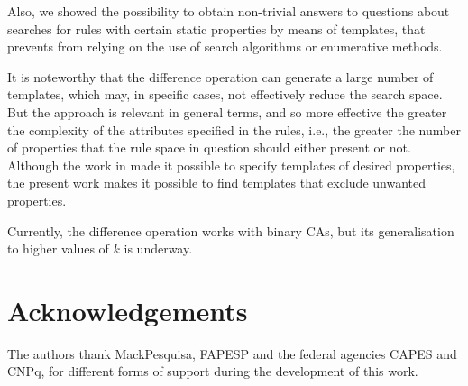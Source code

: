 \documentclass{llncs}
\begin{document}
Also, we showed the possibility to obtain non-trivial answers to questions about searches for rules with certain static properties by means of templates, that prevents from relying on the use of search algorithms or enumerative methods.

It is noteworthy that the difference operation can generate a large number of templates, which may, in specific cases, not effectively reduce the search space. But the approach is relevant in general terms, and so more effective the greater the complexity of the attributes specified in the rules, i.e., the greater the number of properties that the rule space in question should either present or not. Although the work in \cite{deOliveira2014,deOliveira2014b} made it possible to specify templates of desired properties, the present work makes it possible to find templates that exclude unwanted properties.

Currently, the difference operation works with binary CAs, but its generalisation to higher values of $k$ is underway.

\section*{Acknowledgements}
\label{sec:agrdecimentos}
The authors thank MackPesquisa, FAPESP and the federal agencies CAPES and CNPq, for different forms of support during the development of this work.
\end{document}
